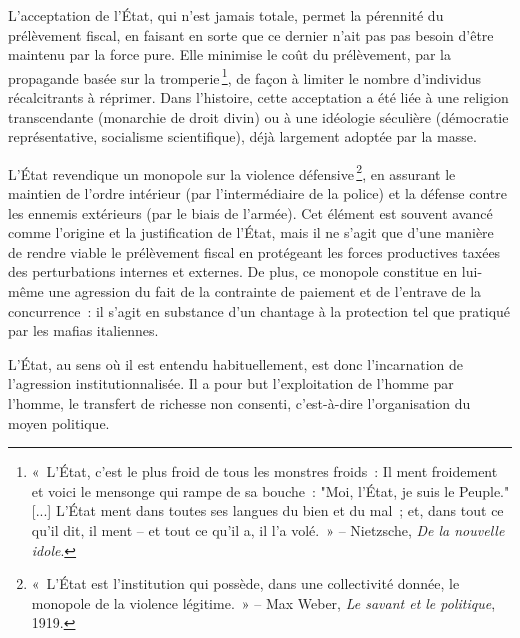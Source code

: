 \documentclass[a4paper,notitlepage]{article}
\newcommand{\eng}[1]{{\NoAutoSpaceBeforeFDP\emph{#1}}}  %
\newcommand{\sfootnote}{\,\footnote}
\begin{document}
L'acceptation de l'État, qui n'est jamais totale, permet la pérennité du prélèvement fiscal, en faisant en sorte que ce dernier n'ait pas pas besoin d'être maintenu par la force pure. Elle minimise le coût du prélèvement, par la propagande basée sur la tromperie\sfootnote{«~L'État, c'est le plus froid de tous les monstres froids~: Il ment froidement et voici le mensonge qui rampe de sa bouche~: "Moi, l'État, je suis le Peuple." [...] L'État ment dans toutes ses langues du bien et du mal~; et, dans tout ce qu'il dit, il ment -- et tout ce qu'il a, il l'a volé.~» -- Nietzsche, \eng{De la nouvelle idole}.}, de façon à limiter le nombre d'individus récalcitrants à réprimer. Dans l'histoire, cette acceptation a été liée à une religion transcendante (monarchie de droit divin) ou à une idéologie séculière (démocratie représentative, socialisme scientifique), déjà largement adoptée par la masse. %

L'État revendique un monopole sur la violence défensive\sfootnote{«~L'État est l'institution qui possède, dans une collectivité donnée, le monopole de la violence légitime.~» -- Max Weber, \emph{Le savant et le politique}, 1919.}, en assurant le maintien de l'ordre intérieur (par l'intermédiaire de la police) et la défense contre les ennemis extérieurs (par le biais de l'armée). Cet élément est souvent avancé comme l'origine et la justification de l'État, mais il ne s'agit que d'une manière de rendre viable le prélèvement fiscal en protégeant les forces productives taxées des perturbations internes et externes. De plus, ce monopole constitue en lui-même une agression du fait de la contrainte de paiement et de l'entrave de la concurrence~: il s'agit en substance d'un chantage à la protection tel que pratiqué par les mafias italiennes.

L'État, au sens où il est entendu habituellement, est donc l'incarnation de l'agression institutionnalisée. Il a pour but l'exploitation de l'homme par l'homme, le transfert de richesse non consenti, c'est-à-dire l'organisation du moyen politique.
\end{document}
